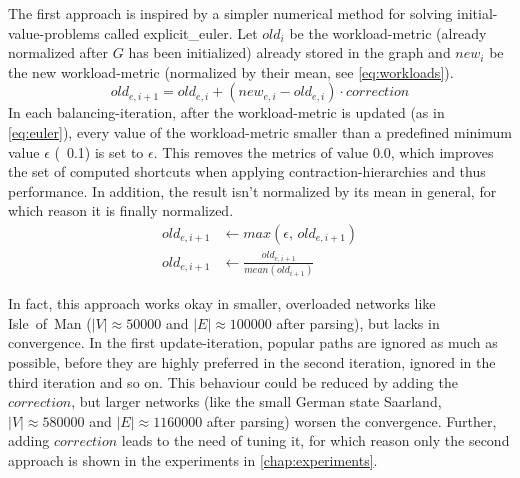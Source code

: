         The first approach is inspired by a simpler numerical method for solving initial-value-problems called \gls{explicit_euler}.
        Let $\mathit{old}_i$ be the workload-\gls{metric} (already normalized after $G$ has been initialized) already stored in the graph and $\mathit{new}_i$ be the new workload-\gls{metric} (normalized by their mean, see \vref{eq:workloads}).
        \begin{equation}
        \label{eq:euler}
            \mathit{old}_{e,i+1} = \mathit{old}_{e,i} + (\mathit{new}_{e,i} - \mathit{old}_{e,i}) \cdot \mathit{correction}
        \end{equation}
        In each \gls{balancing}-iteration, after the workload-\gls{metric} is updated (as in \vref{eq:euler}), every value of the workload-\gls{metric} smaller than a predefined minimum value $\epsilon$ (\eg\ \num{0.1}) is set to $\epsilon$.
        This removes the \glspl{metric} of value \num{0.0}, which improves the set of computed shortcuts when applying \gls{contraction-hierarchies} and thus performance.
        In addition, the result isn't normalized by its mean in general, for which reason it is finally normalized.
        \begin{equation}
        \label{eq:metric_cleanup}
        \begin{aligned}
            \mathit{old}_{e,i+1} &\leftarrow \mathit{max} \left( \epsilon \text{,\ } \mathit{old}_{e,i+1} \right)\\
            \mathit{old}_{e,i+1} &\leftarrow \frac{\mathit{old}_{e,i+1}}{\mathit{mean}(\mathit{old}_{i+1})}
        \end{aligned}
        \end{equation}

        In fact, this approach works okay in smaller, overloaded networks like Isle~of~Man ($|V| \approx \num{50000}$ and $|E| \approx \num{100000}$ after parsing), but lacks in convergence.
        In the first update-iteration, popular paths are ignored as much as possible, before they are highly preferred in the second iteration, ignored in the third iteration and so on.
        This behaviour could be reduced by adding the $\mathit{correction}$, but larger networks (like the small German state Saarland, $|V| \approx \num{580000}$ and $|E| \approx \num{1160000}$ after parsing) worsen the convergence.
        Further, adding $\mathit{correction}$ leads to the need of tuning it, for which reason only the second approach is shown in the experiments in \vref{chap:experiments}.

